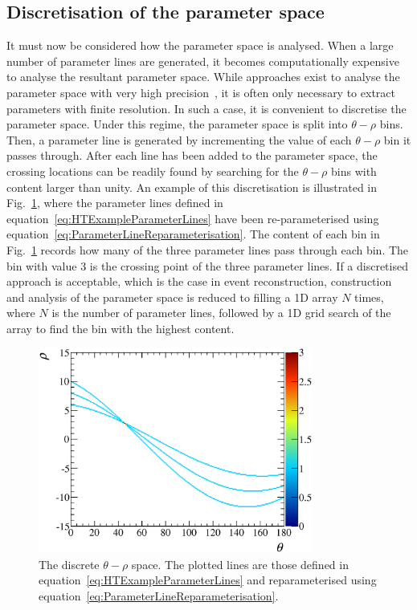 \subsection{Discretisation of the parameter space}
\label{subsec:ParameterSpaceDiscretisation}
It must now be considered how the parameter space is analysed.  When a large number of parameter lines are generated, it becomes computationally expensive to analyse the resultant parameter space.  While approaches exist to analyse the parameter space with very high precision~\cite{331821}, it is often only necessary to extract parameters with finite resolution.  In such a case, it is convenient to discretise the parameter space.  Under this regime, the parameter space is split into $\theta-\rho$ bins.  Then, a parameter line is generated by incrementing the value of each $\theta-\rho$ bin it passes through.  After each line has been added to the parameter space, the crossing locations can be readily found by searching for the $\theta-\rho$ bins with content larger than unity.  An example of this discretisation is illustrated in Fig.~\ref{fig:BinnedParameterSpace}, where the parameter lines defined in equation~\ref{eq:HTExampleParameterLines} have been re-parameterised using equation~\ref{eq:ParameterLineReparameterisation}.  The content of each bin in Fig.~\ref{fig:BinnedParameterSpace} records how many of the three parameter lines pass through each bin.  The bin with value 3 is the crossing point of the three parameter lines.
\newline
\newline
If a discretised approach is acceptable, which is the case in event reconstruction, construction and analysis of the parameter space is reduced to filling a 1D array $N$ times, where $N$ is the number of parameter lines, followed by a 1D grid search of the array to find the bin with the highest content.
\begin{figure}
  \centering
  \includegraphics[width=9cm]{images/hough_transform/binned_parameter_space}
  \caption{The discrete $\theta-\rho$ space.  The plotted lines are those defined in equation~\ref{eq:HTExampleParameterLines} and reparameterised using equation~\ref{eq:ParameterLineReparameterisation}.}
  \label{fig:BinnedParameterSpace}
\end{figure}



